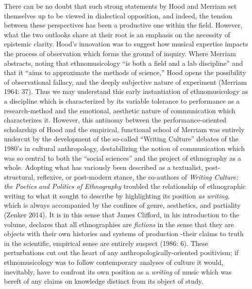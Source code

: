There can be no doubt that such strong statements by Hood and Merriam
set themselves up to be viewed in dialectical opposition, and indeed,
the tension between these perspectives has been a productive one within
the field. However, what the two outlooks share at their root is an
emphasis on the necessity of epistemic clarity. Hood's innovation was to
suggest how musical expertise impacts the process of observation which
forms the ground of inquiry. Where Merriam abstracts, noting that
ethnomusicology ``is both a field and a lab discipline'' and that it
``aims to approximate the methods of science,'' Hood opens the
possibility of observational fallacy, and the deeply subjective nature
of experiment (Merriam 1964: 37). Thus we may understand this early
instantiation of ethnomusicology as a discipline which is characterized
by its variable tolerance to performance as a research-method and the
emotional, aesthetic nature of communication which characterizes it.
However, this antinomy between the performance-oriented scholarship of
Hood and the empirical, functional school of Merriam was entirely
undercut by the development of the so-called ``Writing Culture'' debates
of the 1980's in cultural anthropology, destabilizing the notion of
communication which was so central to both the ``social sciences'' and
the project of ethnography as a whole. Adopting what has variously been
described as a textualist, post-structural, reflexive, or post-modern
stance, the co-authors of \emph{Writing Culture: the Poetics and
Politics of Ethnography} troubled the relationship of ethnographic
writing to what it sought to describe by highlighting its position
\emph{as writing,} which is always accompanied by the confines of genre,
aesthetics, and partiality (Zenker 2014). It is in this sense that James
Clifford, in his introduction to the volume, declares that all
ethnographies are \emph{fictions} in the sense that they are objects
with their own histories and systems of production -their claims to
truth in the scientific, empirical sense are entirely suspect (1986: 6).
These perturbations cut out the heart of any anthropologically-oriented
positivism; if ethnomusicology was to follow contemporary analyses of
culture it would, inevitably, have to confront its own position as a
\emph{writing} of music which was bereft of any claims on knowledge
distinct from its object of study.

